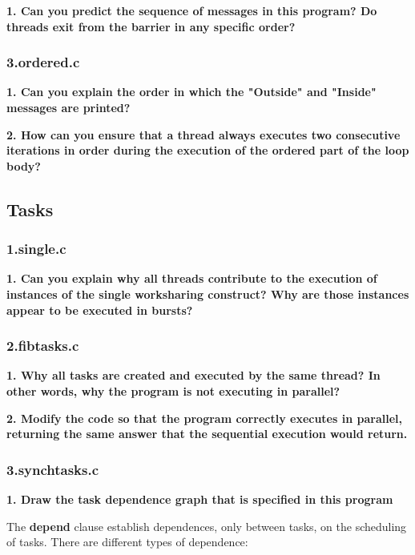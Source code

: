 \documentclass[12pt, a4paper]{article}
\begin{document}
\textbf{1. Can you predict the sequence of messages in this program? Do threads exit from the barrier
in any specific order?}

\subsubsection{3.ordered.c}

\textbf{1. Can you explain the order in which the "Outside" and "Inside" messages are printed?}

\hfill

\textbf{2. How can you ensure that a thread always executes two consecutive iterations in order during
the execution of the ordered part of the loop body?}

\subsection{Tasks}

\subsubsection{1.single.c}

\textbf{1. Can you explain why all threads contribute to the execution of instances of the single worksharing construct? Why are those instances appear to be executed in bursts?}

\subsubsection{2.fibtasks.c}

\textbf{1. Why all tasks are created and executed by the same thread? In other words, why the program
is not executing in parallel?}

\hfill

\textbf{2. Modify the code so that the program correctly executes in parallel, returning the same answer
that the sequential execution would return.}

\subsubsection{3.synchtasks.c}

\textbf{1. Draw the task dependence graph that is specified in this program}

The \textbf{depend} clause establish dependences, only between tasks, on the scheduling of tasks. There are different types of dependence:
\end{document}
